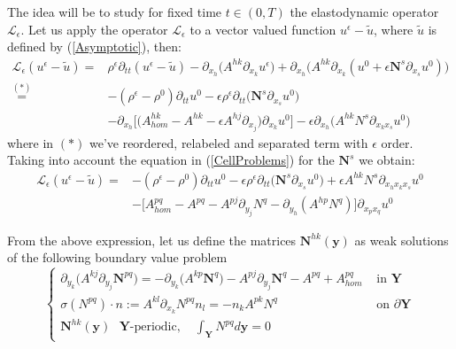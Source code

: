 The idea will be to study for fixed time $t \in (0,T)$ the elastodynamic operator $\mathcal{L}_{\epsilon}$.
Let us apply the operator $\mathcal{L}_{\epsilon}$ to a vector valued function $u^{\epsilon}-\tilde{u}$, where $\tilde{u}$ is defined by (\ref{Asymptotic}), then:
\begin{align*}
    \mathcal{L}_{\epsilon} (u^{\epsilon}-\tilde{u}) =& \rho^{\epsilon} \partial_{tt} (u^{\epsilon}-\tilde{u}) - \partial_{x_h} \big( A^{hk}\partial_{x_k} u^{\epsilon} \big) + \partial_{x_h} \big( A^{hk}\partial_{x_k} (u^0 + \epsilon \mathbf{N}^s \partial_{x_s}u^0 )\big) \\
    \overset{(*)}{=}& - (\rho^{\epsilon}-\rho^0) \partial_{tt} u^0 - \epsilon \rho^{\epsilon} \partial_{tt}\big(\mathbf{N}^s \partial_{x_s}u^0 \big)  \\
    & - \partial_{x_h} \big[ \big( A_{hom}^{hk} - A^{hk} - \epsilon A^{hj}\partial_{x_j}\big) \partial_{x_k} u^0 \big] - \epsilon \partial_{x_h} \big( A^{hk} N^s \partial_{x_k x_s} u^0 \big) 
\end{align*}
where in $(*)$ we've reordered, relabeled and separated term with $\epsilon$ order.
Taking into account the equation in (\ref{CellProblems}) for the $\mathbf{N}^s$ we obtain:
\begin{align*}
    \mathcal{L}_{\epsilon} (u^{\epsilon} - \tilde{u})  =& - (\rho^{\epsilon}-\rho^0) \partial_{tt} u^0 - \epsilon \rho^{\epsilon} \partial_{tt}\big(\mathbf{N}^s \partial_{x_s}u^0 \big) + \epsilon A^{hk}N^s \partial_{x_h x_k x_s}u^0 \\
    & - \big[ A^{pq}_{hom} - A^{pq} - A^{pj} \partial_{y_j} N^q - \partial_{y_h}(A^{hp} N^q) \big] \partial_{x_p x_q} u^0 
\end{align*}


From the above expression, let us define the matrices $\mathbf{N}^{hk}(\mathbf{y})$ as weak solutions of the following boundary value problem
\begin{equation}
    \label{SecondCellProblem}
    \left \{
    \begin{array}{cc}
        \partial_{y_k} \big( A^{kj}\partial_{y_j} \mathbf{N}^{pq}\big) = -\partial_{y_k} \big( A^{kp} \mathbf{N}^q\big) - A^{pj}\partial_{y_j} \mathbf{N}^q - A^{pq} + A^{pq}_{hom} & \text{ in } \mathbf{Y}\\
        \sigma(N^{pq})\cdot n := A^{kl}\partial_{x_k}N^{pq}n_l = - n_k A^{pk}N^q & \text{ on } \partial \mathbf{Y} \\
        \mathbf{N}^{hk}(\mathbf{y}) \text{ $\mathbf{Y}$-periodic}, \quad  \int_{\mathbf{Y}} N^{pq} d \mathbf{y} = 0 &
    \end{array}
    \right .
\end{equation}

